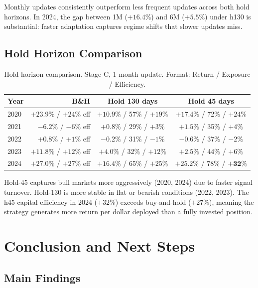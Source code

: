 \documentclass[11pt, letterpaper]{article}
\begin{document}
Monthly updates consistently outperform less frequent updates across both hold
horizons. In 2024, the gap between 1M ($+16.4\%$) and 6M ($+5.5\%$) under h130
is substantial: faster adaptation captures regime shifts that slower updates miss.

\subsection{Hold Horizon Comparison}

\begin{table}[h]
\centering
\caption{Hold horizon comparison. Stage C, 1-month update. Format: Return / Exposure / Efficiency.}
\label{tab:horizon}
\begin{tabular}{lrcc}
\toprule
Year    & B\&H                        & Hold 130 days                      & Hold 45 days \\
\midrule
2020    & $+23.9\%$ / $+24\%$ eff     & $+10.9\%$ / 57\% / $+19\%$         & $\mathbf{+17.4\%}$ / 72\% / $+24\%$ \\
2021    & $-6.2\%$  / $-6\%$ eff      & $\mathbf{+0.8\%}$ / 29\% / $+3\%$  & $+1.5\%$ / 35\% / $+4\%$ \\
2022    & $+0.8\%$  / $+1\%$ eff      & $\mathbf{-0.2\%}$ / 31\% / $-1\%$  & $-0.6\%$ / 37\% / $-2\%$ \\
2023    & $+11.8\%$ / $+12\%$ eff     & $\mathbf{+4.0\%}$ / 32\% / $+12\%$ & $+2.5\%$ / 44\% / $+6\%$ \\
2024    & $+27.0\%$ / $+27\%$ eff     & $+16.4\%$ / 65\% / $+25\%$         & $\mathbf{+25.2\%}$ / 78\% / $\mathbf{+32\%}$ \\
\bottomrule
\end{tabular}
\end{table}

Hold-45 captures bull markets more aggressively (2020, 2024) due to faster signal
turnover. Hold-130 is more stable in flat or bearish conditions (2022, 2023).
The h45 capital efficiency in 2024 ($+32\%$) exceeds buy-and-hold ($+27\%$),
meaning the strategy generates more return per dollar deployed than a fully
invested position.

\section{Conclusion and Next Steps}

\subsection{Main Findings}
\end{document}
